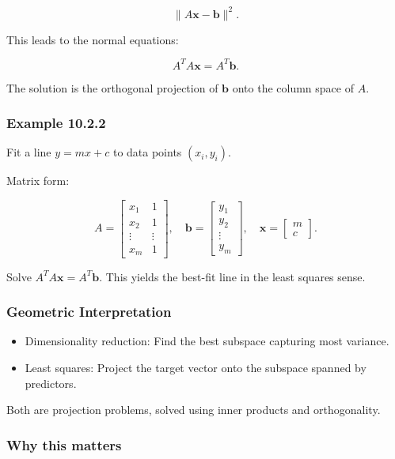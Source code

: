 \documentclass[
  12pt,
  a4paper,
]{article}
\begin{document}
\[\|A\mathbf{x} - \mathbf{b}\|^2.\]

This leads to the normal equations:

\[A^T A \mathbf{x} = A^T \mathbf{b}.\]

The solution is the orthogonal projection of \(\mathbf{b}\) onto the
column space of \(A\).

\subsubsection{Example 10.2.2}\label{example-1022}

Fit a line \(y = mx + c\) to data points \((x_i, y_i)\).

Matrix form:

\[A = \begin{bmatrix}
x_1 & 1 \\
x_2 & 1 \\
\vdots & \vdots \\
x_m & 1
\end{bmatrix}, 
\quad 
\mathbf{b} = \begin{bmatrix} y_1 \\ y_2 \\ \vdots \\ y_m \end{bmatrix},
\quad 
\mathbf{x} = \begin{bmatrix} m \\ c \end{bmatrix}.\]

Solve \(A^T A \mathbf{x} = A^T \mathbf{b}\). This yields the best-fit
line in the least squares sense.

\subsubsection{Geometric
Interpretation}\label{geometric-interpretation-24}

\begin{itemize}
\item
  Dimensionality reduction: Find the best subspace capturing most
  variance.
\item
  Least squares: Project the target vector onto the subspace spanned by
  predictors.
\end{itemize}

Both are projection problems, solved using inner products and
orthogonality.

\subsubsection{Why this matters}\label{why-this-matters-37}
\end{document}
